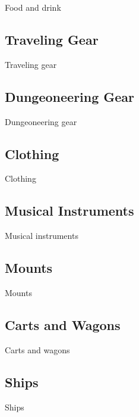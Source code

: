 \begin{multicols}{2}
Food and drink

\subsection{Traveling Gear}

Traveling gear

\subsection{Dungeoneering Gear}

Dungeoneering gear

\subsection{Clothing}

Clothing

\subsection{Musical Instruments}

Musical instruments

\subsection{Mounts}

Mounts

\subsection{Carts and Wagons}

Carts and wagons

\subsection{Ships}

Ships

\end{multicols}
